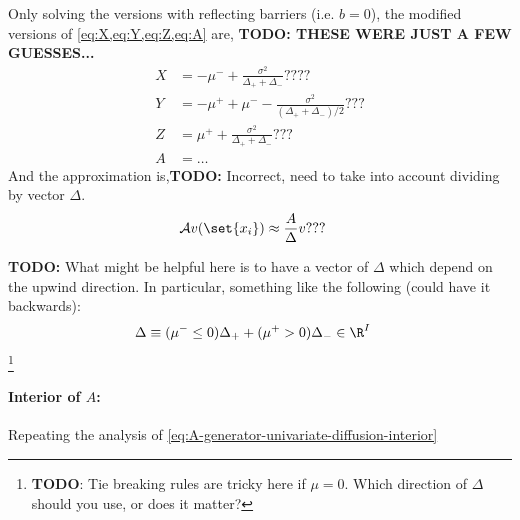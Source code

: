 \documentclass[11pt]{etk-article}
\begin{document}
Only solving the versions with reflecting barriers (i.e. $b=0$), the modified versions of \cref{eq:X,eq:Y,eq:Z,eq:A} are, \textbf{TODO: THESE WERE JUST A FEW GUESSES...}
\begin{align}
X &= - \mu^{-}+ \frac{\sigma^{2}}{\Delta_{+} + \Delta_{-}}????\label{eq:X-nonuniform} \\
Y &= - \mu^{+} + \mu^{-}- \frac{\sigma^{2}}{(\Delta_{+} + \Delta_{-})/2}???\label{eq:-nonuniform} \\
Z &= \mu^{+} + \frac{\sigma^{2}}{\Delta_{+} + \Delta_{-}}???\label{eq:Z-nonuniform}\\
A &= \ldots \label{eq:A-nonuniform}
\end{align}
And the approximation is,\textbf{TODO:} Incorrect, need to take into account dividing by vector $\Delta$.
\begin{align}
\mathcal{A}v(\set{x_i}) &\approx \frac{A}{\Delta} v ???\label{eq:A-operator-approx-nonuniform}
\end{align}

\textbf{TODO:} What might be helpful here is to have a vector of $\Delta$ which depend on the upwind direction.  In particular, something like the following (could have it backwards):
\begin{align}
\Delta &\equiv (\mu^{-} \leq 0)\Delta_{+} + (\mu^{+} > 0)\Delta_{-}\in\R^I
\end{align}
\footnote{\textbf{TODO}: Tie breaking rules are tricky here if $\mu = 0$.  Which direction of $\Delta$ should you use, or does it matter?}

\paragraph{Interior of $A$:} Repeating the analysis of \cref{eq:A-generator-univariate-diffusion-interior}
\end{document}
